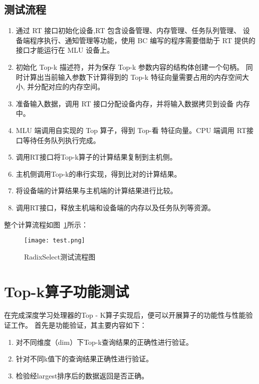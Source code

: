 \subsection{测试流程}
\begin{enumerate}
    \item 通过 RT 接口初始化设备,RT 包含设备管理、内存管理、任务队列管理、 设备端程序执行、通知管理等功能，使用 BC 编写的程序需要借助于 RT 提供的 接口才能运行在 MLU 设备上。
    \item 初始化 Top-k 描述符，并为保存 Top-k 参数内容的结构体创建一个句柄。 同时计算出当前输入参数下计算得到的 Top-k 特征向量需要占用的内存空间大 小, 并分配对应的内存空间。
    \item 准备输入数据，调用 RT 接口分配设备内存，并将输入数据拷贝到设备 内存中。
    \item MLU 端调用自实现的 Top 算子，得到 Top-看 特征向量。CPU 端调用 RT接口等待任务队列执行完成。
    
    \item 调用RT接口将Top-k算子的计算结果复制到主机侧。
    \item 主机侧调用Top-k的串行实现，得到比对的计算结果。
    \item 将设备端的计算结果与主机端的计算结果进行比较。
    \item 调用RT接口，释放主机端和设备端的内存以及任务队列等资源。
    
\end{enumerate}
整个计算流程如图~\ref{fig:test}所示：

\begin{figure}[ht]
    \centering
    \texttt{[image: test.png]}
    \caption{RadixSelect测试流程图}
    \label{fig:test}
\end{figure}


\section{Top-k算子功能测试}
在完成深度学习处理器的Top - K算子实现后，便可以开展算子的功能性与性能验证工作。
首先是功能验证，其主要内容如下：
\begin{enumerate}
\item 对不同维度（dim）下Top-k查询结果的正确性进行验证。
\item 针对不同k值下的查询结果正确性进行验证。
\item 检验经largest排序后的数据返回是否正确。
\end{enumerate}


